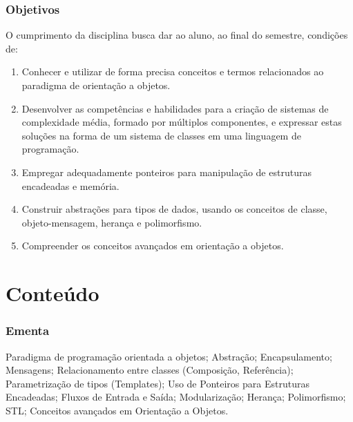 \documentclass[aspectratio=169]{beamer}
\begin{document}
\begin{frame}\frametitle{Objetivos}
O cumprimento da disciplina busca dar ao aluno, ao final do semestre, condições de:
\begin{enumerate}
	\item Conhecer e utilizar de forma precisa conceitos e termos relacionados ao paradigma de orientação a objetos.
	\item Desenvolver as competências e habilidades para a criação de sistemas de complexidade média, formado por múltiplos componentes, e expressar estas soluções na forma de um sistema de classes em uma linguagem de programação.
	\item Empregar adequadamente ponteiros para manipulação de estruturas encadeadas e memória.
	\item Construir abstrações para tipos de dados, usando os conceitos de classe, objeto-mensagem, herança e polimorfismo.
	\item Compreender os conceitos avançados em orientação a objetos.
\end{enumerate}
\end{frame}

\section{Conte\'udo}

\begin{frame}\frametitle{Ementa}
Paradigma de programação orientada a objetos; Abstração; Encapsulamento; Mensagens; Relacionamento entre classes (Composição, Referência); Parametrização de tipos (Templates); Uso de Ponteiros para Estruturas Encadeadas; Fluxos de Entrada e Saída; Modularização; Herança; Polimorfismo; STL; Conceitos avançados em Orientação a Objetos.
\end{frame}
\end{document}
